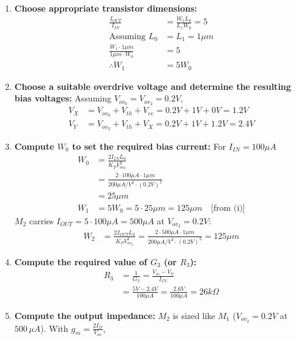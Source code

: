 \begin{enumerate}
  \item \textbf{Choose appropriate transistor dimensions:}
    \begin{align*}
      \frac{I_{OUT}}{I_{IN}} &= \frac{W_1 L_0}{L_1 W_0} = 5 \\
      \text{Assuming } L_0 &= L_1 = 1 \mu m \\
      \frac{W_1 \cdot 1 \mu m}{1 \mu m \cdot W_0} &= 5 \\
      \therefore W_1 &= 5 W_0 \tag{i}
    \end{align*}
  \item \textbf{Choose a suitable overdrive voltage and determine
    the resulting bias voltages:} Assuming $V_{ov_0} = V_{ov_2} = 0.2V$,
    \begin{align*}
      V_{X} &= V_{ov_0} + V_{th} + V_{ee} = 0.2V + 1V + 0V = 1.2V \\
      V_{Y} &= V_{ov_2} + V_{th} + V_{X} = 0.2V + 1V + 1.2V = 2.4V
    \end{align*}
  \item \textbf{Compute $W_0$ to set the required bias current:}
    For $I_{IN} = 100 \mu A$
    \begin{align*}
      W_0 &= \frac{2 I_{IN} L_0}{K_P V_{ov_0}^2} \\
          &= \frac{2 \cdot 100 \mu A \cdot 1 \mu m}{200 \mu A/V^2 \cdot (0.2V)^2} \\
          &= 25 \mu m \\
      W_1 &= 5 W_0 = 5 \cdot 25 \mu m = 125 \mu m \quad \text{[from (i)]}
    \end{align*}
    \(M_2\) carries \(I_{OUT} = 5 \cdot 100 \mu A = 500 \mu A\) at \(V_{ov_2} = 0.2V\):
    \begin{align*}
      W_2 &= \frac{2 I_{OUT} L_2}{K_P V_{ov_2}^2} = \frac{2 \cdot 500 \mu A \cdot 1 \mu m}{200 \mu A/V^2 \cdot (0.2V)^2} = 125 \mu m
    \end{align*}
  \item \textbf{Compute the required value of $G_3$ (or $R_3$):}
    \begin{align*}
      R_3 &= \frac{1}{G_3} = \frac{V_{cc} - V_{Y}}{I_{IN}} \\
          &= \frac{5V - 2.4V}{100 \mu A} = \frac{2.6V}{100 \mu A} = 26k \Omega
    \end{align*}
  \item \textbf{Compute the output impedance:} \(M_2\) is sized like \(M_1\)
    (\(V_{ov_2} = 0.2V\) at \(500\,\mu A\)). With \(g_m = \frac{2 I_D}{V_{ov}}\),

\end{enumerate}
